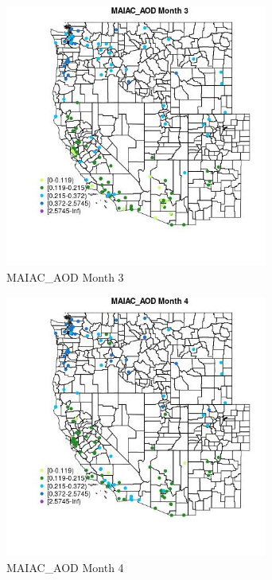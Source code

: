 \begin{figure} 
\centering  
\includegraphics[width=0.77\textwidth]{Code_Outputs/Report_ML_input_PM25_Step4_part_e_de_duplicated_aves_MapObsMo3MAIAC_AOD.jpg} 
\caption{\label{fig:Report_ML_input_PM25_Step4_part_e_de_duplicated_avesMapObsMo3MAIAC_AOD}MAIAC_AOD Month 3} 
\end{figure} 
 

\clearpage 

\begin{figure} 
\centering  
\includegraphics[width=0.77\textwidth]{Code_Outputs/Report_ML_input_PM25_Step4_part_e_de_duplicated_aves_MapObsMo4MAIAC_AOD.jpg} 
\caption{\label{fig:Report_ML_input_PM25_Step4_part_e_de_duplicated_avesMapObsMo4MAIAC_AOD}MAIAC_AOD Month 4} 
\end{figure} 
 


